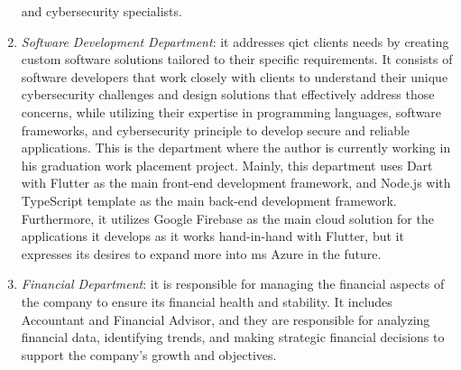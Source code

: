 \begin{multicols}{2}
\begin{enumerate}
                  and cybersecurity specialists.
            \item \textit{Software Development Department}: it addresses \acrshort{qict} clients needs by creating
                  custom software solutions tailored to their specific requirements. It consists of software
                  developers that work closely with clients to understand their unique cybersecurity challenges and
                  design solutions that effectively address those concerns, while utilizing their expertise in
                  programming languages, software frameworks, and cybersecurity principle to develop secure and
                  reliable applications. This is the department where the author is currently working in his
                  graduation work placement project. Mainly, this department uses Dart with Flutter as the main
                  front-end development framework, and Node.js with TypeScript template as the main back-end
                  development framework. Furthermore, it utilizes Google Firebase as the  main cloud solution for
                  the applications it develops as it works hand-in-hand with Flutter, but it expresses its
                  desires to expand more into \acrshort{ms} Azure in the future.
            \item \textit{Financial Department}: it is responsible for managing the financial aspects of the company
                  to ensure its financial health and stability. It includes Accountant and Financial Advisor, and
                  they are responsible for analyzing financial data, identifying trends, and making strategic
                  financial decisions to support the company's growth and objectives.
      \end{enumerate}

\end{multicols}

